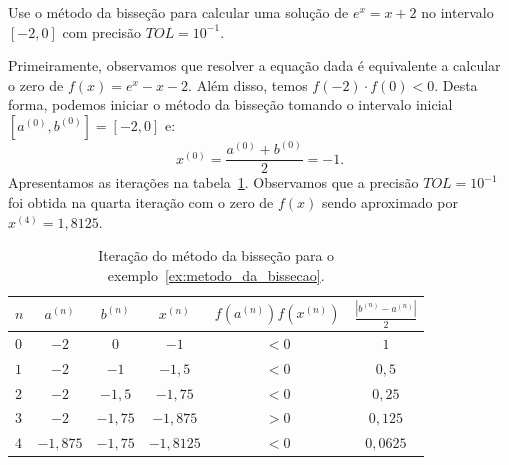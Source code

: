 \begin{ex}\label{ex:metodo_da_bissecao}Use o método da bisseção para calcular uma solução de $e^x = x + 2$ no intervalo $[-2, 0]$ com precisão $TOL = 10^{-1}$.
\end{ex}
\begin{sol}
  Primeiramente, observamos que resolver a equação dada é equivalente a calcular o zero de $f(x) = e^x - x - 2$. Além disso, temos $f(-2)\cdot f(0) < 0$. Desta forma, podemos iniciar o método da bisseção tomando o intervalo inicial $[a^{(0)}, b^{(0)}] = [-2, 0]$ e:
  \begin{equation*}
    x^{(0)} = \frac{a^{(0)} + b^{(0)}}{2} = -1.
  \end{equation*}
  Apresentamos as iterações na tabela~\ref{tab:metodo_da_bissecao}. Observamos que a precisão $TOL = 10^{-1}$ foi obtida na quarta iteração com o zero de $f(x)$ sendo aproximado por $x^{(4)} = 1,8125$.
  \begin{table}
    \centering
    \caption{Iteração do método da bisseção para o exemplo~\ref{ex:metodo_da_bissecao}.}
    \label{tab:metodo_da_bissecao}
    \begin{tabular}{l|ccc|c|c}\hline
      $n$ & $a^{(n)}$ & $b^{(n)}$ & $x^{(n)}$ & $f(a^{(n)})f(x^{(n)})$ & $\displaystyle \frac{|b^{(n)}-a^{(n)}|}{2}$\\\hline
      $0$ & $-2$ & $0$ & $-1$ & $< 0$ & $1$\\
      $1$ & $-2$ & $-1$ & $-1,5$ & $<0$ & $0,5$\\
      $2$ & $-2$ & $-1,5$ & $-1,75$ & $<0$ & $0,25$\\
      $3$ & $-2$ & $-1,75$ & $-1,875$ & $>0$ & $0,125$\\
      $4$ & $-1,875$ & $-1,75$ & $-1,8125$ & $<0$ & $0,0625$\\\hline
    \end{tabular}
  \end{table}
  

\end{sol}
